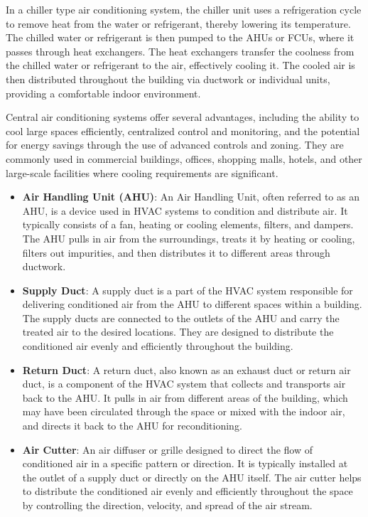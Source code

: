 \documentclass{article}
\begin{document}
In a chiller type air conditioning system, the chiller unit uses a refrigeration cycle to remove heat from the water or refrigerant, thereby lowering its temperature. The chilled water or refrigerant is then pumped to the AHUs or FCUs, where it passes through heat exchangers. The heat exchangers transfer the coolness from the chilled water or refrigerant to the air, effectively cooling it. The cooled air is then distributed throughout the building via ductwork or individual units, providing a comfortable indoor environment.

Central air conditioning systems offer several advantages, including the ability to cool large spaces efficiently, centralized control and monitoring, and the potential for energy savings through the use of advanced controls and zoning. They are commonly used in commercial buildings, offices, shopping malls, hotels, and other large-scale facilities where cooling requirements are significant.

\begin{itemize}
  \item \textbf{Air Handling Unit (AHU)}: An Air Handling Unit, often referred to as an AHU, is a device used in HVAC systems to condition and distribute air. It typically consists of a fan, heating or cooling elements, filters, and dampers. The AHU pulls in air from the surroundings, treats it by heating or cooling, filters out impurities, and then distributes it to different areas through ductwork.

  \item \textbf{Supply Duct}: A supply duct is a part of the HVAC system responsible for delivering conditioned air from the AHU to different spaces within a building. The supply ducts are connected to the outlets of the AHU and carry the treated air to the desired locations. They are designed to distribute the conditioned air evenly and efficiently throughout the building.
  
  \item \textbf{Return Duct}: A return duct, also known as an exhaust duct or return air duct, is a component of the HVAC system that collects and transports air back to the AHU. It pulls in air from different areas of the building, which may have been circulated through the space or mixed with the indoor air, and directs it back to the AHU for reconditioning.
  \item \textbf{Air Cutter}: An air diffuser or grille designed to direct the flow of conditioned air in a specific pattern or direction. It is typically installed at the outlet of a supply duct or directly on the AHU itself. The air cutter helps to distribute the conditioned air evenly and efficiently throughout the space by controlling the direction, velocity, and spread of the air stream.
\end{itemize}
\end{document}
